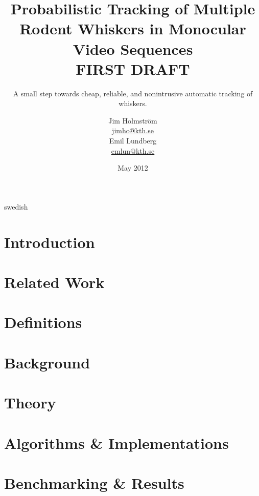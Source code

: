 \documentclass[a4paper,11pt]{kth-mag}
\title{
    Probabilistic Tracking of Multiple Rodent Whiskers in Monocular Video Sequences
    \\FIRST DRAFT
}
\subtitle{
    A small step towards cheap, reliable, and nonintrusive automatic tracking of whiskers.
}
\author{
    Jim Holmström\\
    \href{mailto:jimho@kth.se}{jimho@kth.se}\\
    Emil Lundberg\\
    \href{mailto:emlun@kth.se}{emlun@kth.se}
}
\date{May 2012}
\begin{document}
\frontmatter
\pagestyle{empty}
\removepagenumbers
\maketitle
{}
\begin{abstract}
    
\end{abstract}
\clearpage
\begin{foreignabstract}{swedish}
    
\end{foreignabstract}
\clearpage
\tableofcontents*
\mainmatter
\pagestyle{newchap}
\chapter{Introduction}
    \label{sec:introduction}
    

\chapter{Related Work}
    \label{sec:related_work}
    

\chapter{Definitions}
    \label{sec:definitions}
    

\chapter{Background}
    \label{sec:Background}
    

\chapter{Theory}
    \label{sec:theory}
    


\chapter{Algorithms \& Implementations}
    \label{sec:algorithms_implementations}
    


\chapter{Benchmarking \& Results}
    \label{sec:benchmarks_results}
    
\end{document}
